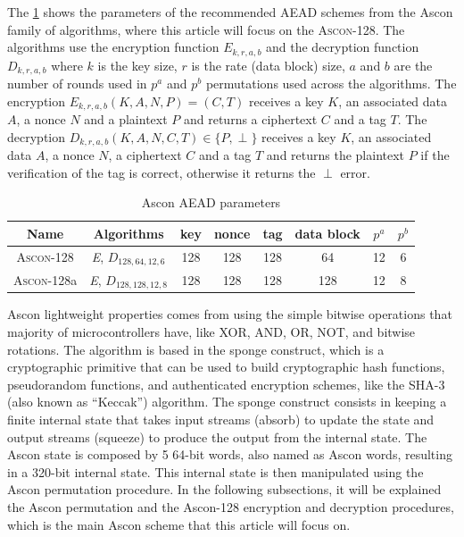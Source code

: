 \documentclass[11pt,twoside]{article}
\begin{document}
The \cref{table:1} shows the parameters of the recommended AEAD schemes from the Ascon family of algorithms, where this article will focus on the \textsc{Ascon-128}. The algorithms use the encryption function $\textit{E}_{k,r,a,b}$ and the decryption function $\textit{D}_{k,r,a,b}$ where $k$ is the key size, $r$ is the rate (data block) size, $a$ and $b$ are the number of rounds used in $p^a$ and $p^b$ permutations used across the algorithms. The encryption $\textit{E}_{k,r,a,b}(K, A, N, P) = (C, T)$ receives a key $K$, an associated data $A$, a nonce $N$ and a plaintext $P$ and returns a ciphertext $C$ and a tag $T$. The decryption $\textit{D}_{k,r,a,b}(K, A, N, C, T) \in \{P, \perp\}$ receives a key $K$, an associated data $A$, a nonce $N$, a ciphertext $C$ and a tag $T$ and returns the plaintext $P$ if the verification of the tag is correct, otherwise it returns the $\perp$ error.

\begin{table}
  \centering
  \begin{tabular}{|c|c|cccc|cc|}
    \hline
    \textbf{Name}       & \textbf{Algorithms}                     & \textbf{key} & \textbf{nonce} & \textbf{tag} & \textbf{data block} & \textbf{$p^a$} & \textbf{$p^b$} \\ \hline
    \textsc{Ascon-128}  & \textit{E}, $\textit{D}_{128,64,12,6}$  & 128          & 128            & 128          & 64                  & 12             & 6              \\ \hline
    \textsc{Ascon-128}a & \textit{E}, $\textit{D}_{128,128,12,8}$ & 128          & 128            & 128          & 128                 & 12             & 8              \\ \hline
  \end{tabular}
  \caption{Ascon AEAD parameters}
  \label{table:1}
\end{table}

Ascon lightweight properties comes from using the simple bitwise operations that majority of microcontrollers have, like XOR, AND, OR, NOT, and bitwise rotations. The algorithm is based in the sponge construct, which is a cryptographic primitive that can be used to build cryptographic hash functions, pseudorandom functions, and authenticated encryption schemes, like the SHA-3 (also known as “Keccak”) \cite{bertoni2015keccak} algorithm. The sponge construct consists in keeping a finite internal state that takes input streams (absorb) to update the state and output streams (squeeze) to produce the output from the internal state. The Ascon state is composed by 5 64-bit words, also named as Ascon words, resulting in a 320-bit internal state. This internal state is then manipulated using the Ascon permutation procedure. In the following subsections, it will be explained the Ascon permutation and the Ascon-128 encryption and decryption procedures, which is the main Ascon scheme that this article will focus on.
\end{document}
